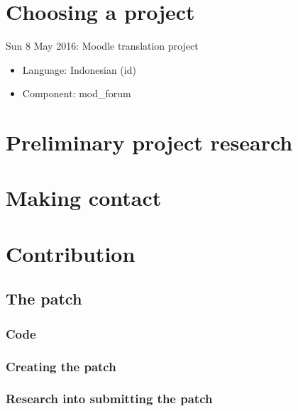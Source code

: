 \documentclass{article}
\begin{document}
\section{Choosing a project} %
\label{sec:choosing_a_project}

Sun 8 May 2016: Moodle translation project
\begin{itemize}
	\item Language: Indonesian (id)
	\item Component: mod_forum
\end{itemize}

\section{Preliminary project research} %
\label{sec:preliminary_project_research}


\section{Making contact} %
\label{sec:making_contact}


\section{Contribution} %
\label{sec:contribution}

\subsection{The patch} %
\label{sub:the_patch}

\subsubsection{Code} %
\label{subsub:code}


\subsubsection{Creating the patch}
\label{subsub:creating_the_patch}


\subsubsection{Research into submitting the patch}
\label{subsub:research_into_submitting_the_patch}
\end{document}
